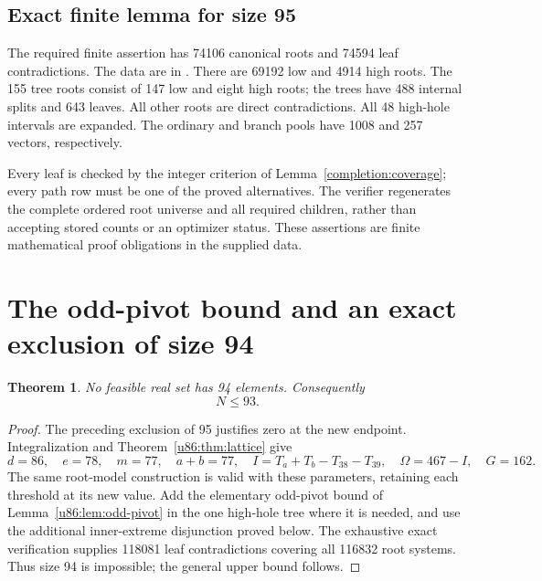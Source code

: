 \documentclass[11pt,a4paper]{article}
\newtheorem{theorem}{Theorem}[section]
\theoremstyle{remark}
\begin{document}
\subsection{Exact finite lemma for size 95}
\label{u86:finite:95}
The required finite assertion has 74106 canonical roots and 74594
leaf contradictions. The data are in .
There are 69192 low and 4914 high roots. The 155 tree roots consist of
147 low and eight high roots; the trees have 488 internal splits and
643 leaves. All other roots are direct contradictions. All 48 high-hole
intervals are expanded. The ordinary and branch pools have 1008 and 257
vectors, respectively.

Every leaf is checked by the integer criterion of
Lemma~\ref{completion:coverage}; every path row must be one of the
proved alternatives. The verifier  regenerates
the complete ordered root universe and all required children, rather than
accepting stored counts or an optimizer status. These assertions are finite
mathematical proof obligations in the supplied data.



\section{The odd-pivot bound and an exact exclusion of size 94}\label{u86:sec:upper93}
\begin{theorem}\label{u86:thm:upper93}
No feasible real set has 94 elements. Consequently
\[
 \boxed{N\le93.}
\]
\end{theorem}
\begin{proof}
The preceding exclusion of 95 justifies zero at the new endpoint.
Integralization and Theorem~\ref{u86:thm:lattice} give
\[
 d=86,\quad e=78,\quad m=77,\quad a+b=77,\quad
 I=T_a+T_b-T_{38}-T_{39},\quad\Omega=467-I,\quad G=162.
\]
The same root-model construction is valid with these parameters,
retaining each threshold at its new value. Add the elementary
odd-pivot bound of Lemma~\ref{u86:lem:odd-pivot} in the one high-hole tree
where it is needed, and use the additional inner-extreme disjunction
proved below. The exhaustive exact verification supplies 118081 leaf
contradictions covering all 116832 root systems. Thus size 94 is
impossible; the general upper bound follows.
\end{proof}
\end{document}
